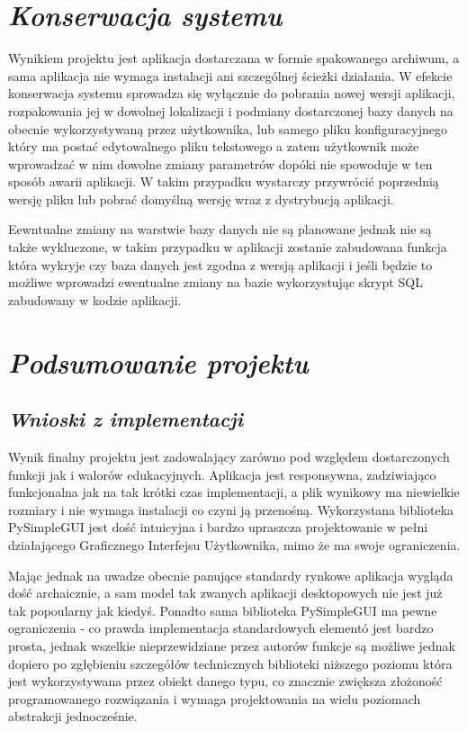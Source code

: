 \documentclass[a4paper,10pt, twoside]{report}
\newcommand{\customstylechapter}[1]{\large{\textit{#1}}}
\newcommand{\customstylesection}[1]{\textbf{\textit{#1}}}
\begin{document}
\chapter{\customstylechapter{Konserwacja systemu}}
{Wynikiem projektu jest aplikacja dostarczana w formie spakowanego archiwum, a 
sama aplikacja nie wymaga instalacji ani szczególnej ścieżki działania. W 
efekcie konserwacja systemu sprowadza się wyłącznie do pobrania nowej wersji 
aplikacji, rozpakowania jej w dowolnej lokalizacji i podmiany dostarczonej bazy 
danych na obecnie wykorzystywaną przez użytkownika, lub samego pliku 
konfiguracyjnego  który ma postać edytowalnego pliku 
tekstowego a zatem użytkownik może wprowadzać w nim dowolne zmiany parametrów 
dopóki nie spowoduje w ten sposób awarii aplikacji. W takim przypadku wystarczy 
przywrócić poprzednią wersję pliku lub pobrać domyślną wersję wraz z dystrybucją
 aplikacji.}

{Eewntualne zmiany na warstwie bazy danych nie są planowane jednak nie są także 
wykluczone, w takim przypadku w aplikacji zostanie zabudowana funkcja która 
wykryje czy baza danych jest zgodna z wersją aplikacji i jeśli będzie to możliwe
 wprowadzi ewentualne zmiany na bazie wykorzystując skrypt SQL zabudowany w 
kodzie aplikacji.}

\chapter{\customstylechapter{Podsumowanie projektu}}
\section{\customstylesection{Wnioski z implementacji}}
{Wynik finalny projektu jest zadowalający zarówno pod względem dostarczonych 
funkcji jak i walorów edukacyjnych. Aplikacja jest responsywna, zadziwiająco 
funkcjonalna jak na tak krótki czas implementacji, a plik wynikowy ma niewielkie
 rozmiary i nie wymaga instalacji co czyni ją przenośną. Wykorzystana biblioteka
PySimpleGUI jest dość intuicyjna i bardzo upraszcza projektowanie w pełni 
działającego Graficznego Interfejsu Użytkownika, mimo że ma swoje ograniczenia.}

\medskip
{Mając jednak na uwadze obecnie panujące standardy rynkowe aplikacja wygląda 
dość archaicznie, a sam model tak zwanych aplikacji desktopowych nie jest już 
tak popoularny jak kiedyś. Ponadto sama biblioteka PySimpleGUI ma pewne 
ograniczenia - co prawda implementacja standardowych elementó jest bardzo 
prosta, jednak wszelkie nieprzewidziane przez autorów funkcje są możliwe jednak 
dopiero po zgłębieniu szczegółów technicznych biblioteki niższego poziomu 
która jest wykorzystywana przez obiekt danego typu, co znacznie zwiększa 
złożoność programowanego rozwiązania i wymaga projektowania na wielu poziomach 
abstrakcji jednocześnie.}
\end{document}

